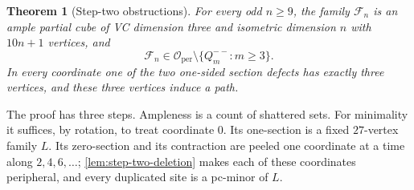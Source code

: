 \documentclass[11pt]{article}
\newtheorem{theorem}{Theorem}[section]
\theoremstyle{definition}
\theoremstyle{remark}
\newcommand{\Oper}{\mathcal O_{\mathrm{per}}}
\begin{document}
\begin{theorem}[Step-two obstructions]
\label{thm:step-two}
For every odd \(n\ge9\), the family \(\mathcal F_n\) is an ample partial cube
of VC dimension three and isometric dimension \(n\) with \(10n+1\)
vertices, and
\[
 \mathcal F_n\in\Oper\setminus\{Q_m^{--}:m\ge3\}.
\]
In every coordinate one of the two one-sided section defects has exactly
three vertices, and these three vertices induce a path.
\end{theorem}

The proof has three steps.  Ampleness is a count of shattered sets.  For
minimality it suffices, by rotation, to treat coordinate \(0\).  Its
one-section is a fixed \(27\)-vertex family \(L\).  Its zero-section and
its contraction are peeled one coordinate at a time along
\(2,4,6,\ldots\); \cref{lem:step-two-deletion} makes each of these
coordinates peripheral, and every duplicated site is a pc-minor of \(L\).
\end{document}
